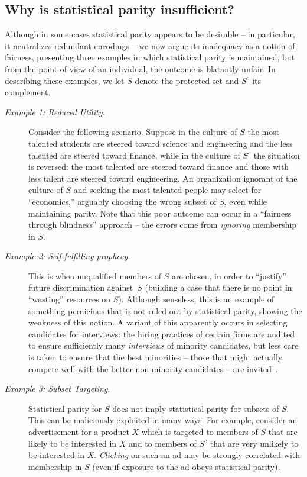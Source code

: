 \documentclass[letterpaper,11pt]{article}
\theoremstyle{definition}
\newcommand{\Sfp}{Self-fulfilling prophecy}
\newcommand{\Scomp}{S^c}
\begin{document}
\subsection{Why is statistical parity insufficient?}
Although in some cases statistical parity appears to be desirable -- in
particular, it neutralizes redundant encodings --  we 
now argue its inadequacy as a notion of fairness,
presenting three examples in which statistical parity is
maintained, but from the point of view of an individual, the outcome
is blatantly unfair.  In describing these examples, we let $S$ denote
the protected set and $\Scomp$ its complement.

\begin{description}
\item[{\em Example 1: Reduced Utility.}]\label{ex:poor_utility}
  Consider the following scenario. %
  Suppose in the culture of $S$ the most talented students are
  steered toward science and engineering and the less talented
  are steered toward finance, while in the culture of $\Scomp$
  the situation is reversed: the most talented are steered toward finance
  and those with less talent are steered toward engineering.
  An organization ignorant of the culture of $S$ and seeking the most talented people may select for
  ``economics,'' arguably choosing the wrong subset of $S$, even while
  maintaining parity.
  Note that this poor outcome can occur in a ``fairness
  through blindness'' approach -- the errors come from {\em ignoring} membership
  in $S$.
\item[{\em Example 2: \Sfp .}]  This is when unqualified members of $S$ are
  chosen, in order to ``justify'' future discrimination against~$S$ (building a
  case that there is no point in ``wasting'' resources on $S$).
  Although senseless, this is an example of something pernicious that is not
  ruled out by statistical parity, showing the weakness of this notion.
A variant of this apparently occurs in selecting candidates for interviews: the hiring practices of certain firms are audited to ensure sufficiently many {\em interviews} of minority candidates, but less care is taken to ensure that the best minorities -- those that might actually compete well with the better non-minority candidates -- are invited~\cite{Zarsky11}.
\item[{\em Example 3: Subset Targeting}.] Statistical parity for $S$ does not imply
  statistical parity for subsets of $S$. This can be maliciously exploited in
  many ways. For example, consider an advertisement for a product $X$ which is
  targeted to members of $S$ that are likely to be interested in $X$ and to
  members of $\Scomp$ that are very unlikely to be interested in $X$. {\em Clicking}
  on such an ad may be strongly correlated with membership in $S$ (even if
  exposure to the ad obeys statistical parity).
\end{description}
\end{document}
